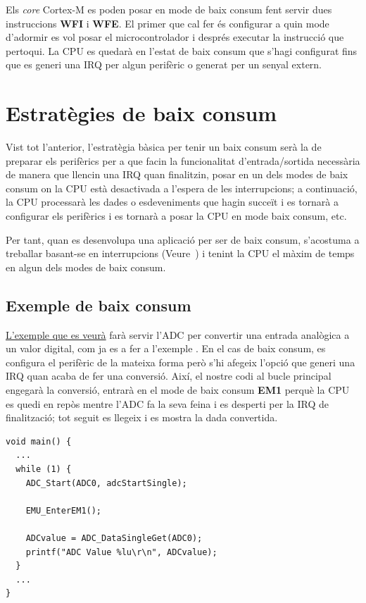 Els {\em core} Cortex-M es poden posar en mode de baix consum fent servir dues instruccions {\bf WFI} i {\bf WFE}. El primer que cal fer és configurar a quin mode d'adormir es vol posar el microcontrolador i després executar la instrucció que pertoqui. La CPU es quedarà en l'estat de baix consum que s'hagi configurat fins que es generi una \gls{IRQ} per algun perifèric o generat per un senyal extern.

\section{Estratègies de baix consum}
\label{sec:lowpowerstrategies}
Vist tot l'anterior, l'estratègia bàsica per tenir un baix consum serà la de preparar els perifèrics per a que facin la funcionalitat d'entrada/sortida necessària de manera que llencin una \gls{IRQ} quan finalitzin, posar en un dels modes de baix consum on la CPU està desactivada a l'espera de les interrupcions; a continuació, la CPU processarà les dades o esdeveniments que hagin succeït i es tornarà a configurar els perifèrics i es tornarà a posar la CPU en mode baix consum, etc.

Per tant, quan es desenvolupa una aplicació per ser de baix consum, s'acostuma a treballar basant-se en interrupcions (Veure~) i tenint la CPU el màxim de temps en algun dels modes de baix consum.

\subsection{Exemple de baix consum}
\href{https://github.com/mariusmm/cursembedded/tree/master/Simplicity/ADC_1_LP}{L'exemple que es veurà} farà servir l'\gls{ADC} per convertir una entrada analògica a un valor digital, com ja es a fer a l'exemple . En el cas de baix consum, es configura el perifèric de la mateixa forma però s'hi afegeix l'opció que generi una \gls{IRQ} quan acaba de fer una conversió. Així, el nostre codi al bucle principal engegarà la conversió, entrarà en el mode de baix consum {\bf EM1} perquè la CPU es quedi en repòs mentre l'ADC fa la seva feina i es desperti per la \gls{IRQ} de finalització; tot seguit es llegeix i es mostra la dada convertida.

\begin{lstlisting}[style=customc,caption={Bucle principal amb funcions de baix consum}, label=ADC_LP]
void main() {
  ...
  while (1) {
    ADC_Start(ADC0, adcStartSingle);

    EMU_EnterEM1();

    ADCvalue = ADC_DataSingleGet(ADC0);
    printf("ADC Value %lu\r\n", ADCvalue);
  }
  ...
}
\end{lstlisting}

